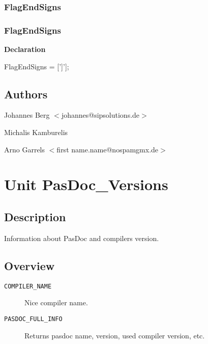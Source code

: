 \documentclass{report}
\newif\ifpdf
\begin{document}
\subsection*{\large{\textbf{FlagEndSigns}}\normalsize\hspace{1ex}\hrulefill}
\else
\subsection*{FlagEndSigns}
\fi
\label{PasDoc_Utils-FlagEndSigns}
\begin{list}{}{
\setlength{\itemindent}{0cm}
\setlength{\listparindent}{0cm}
\setlength{\leftmargin}{\evensidemargin}
\addtolength{\leftmargin}{\tmplength}
\settowidth{\labelsep}{X}
\addtolength{\leftmargin}{\labelsep}
\setlength{\labelwidth}{\tmplength}
}
\item[\textbf{Declaration}\hfill]
\ifpdf
\begin{flushleft}
\fi
\begin{ttfamily}
FlagEndSigns = [']'];\end{ttfamily}

\ifpdf
\end{flushleft}
\fi

\end{list}
\section{Authors}
\par
Johannes Berg {$<$}johannes@sipsolutions.de{$>$}

\par
Michalis Kamburelis

\par
Arno Garrels {$<$}first name.name@nospamgmx.de{$>$}

\chapter{Unit PasDoc{\_}Versions}
\label{PasDoc_Versions}
\section{Description}
Information about PasDoc and compilers version.
\section{Overview}
\begin{description}
\item[\texttt{COMPILER{\_}NAME}]Nice compiler name.
\item[\texttt{PASDOC{\_}FULL{\_}INFO}]Returns pasdoc name, version, used compiler version, etc.
\end{description}
\end{document}
